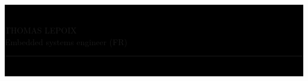 \documentclass[a4paper]{article}
\begin{document}
\setlength{\fboxrule}{1.1pt}
\centering

\ \vspace{0.5cm}%

\if{}\colorbox{black}{ \fi\begin{minipage}[H]{0.75\paperwidth}
	\centering
	\if{}\rule{\textwidth}{1.1pt}\\\fi
	\if{}\vspace{0.3cm}\fi
	\if{}\color{white}\fi
	\huge THOMAS LEPOIX\\
	\LARGE Embedded systems engineer (FR)\\
	\normalsize
	\if{}\vspace{0.3cm}\fi
	\if{}\rule{\textwidth}{1.1pt}\\\fi
	\end{minipage}\if{}} \fi

\vspace{0.5cm}%
\end{document}
